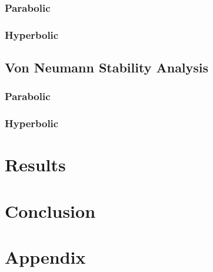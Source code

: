 \documentclass[iop]{emulateapj}
\begin{document}
			\subsubsection{Parabolic}
			\subsubsection{Hyperbolic}
		\subsection{Von Neumann Stability Analysis}
			\subsubsection{Parabolic}
			\subsubsection{Hyperbolic}
	\section{Results}
	\section{Conclusion}
	\section{Appendix}
			
	
	
	
	\begin{acronym}
	\end{acronym}
	
\end{document}
